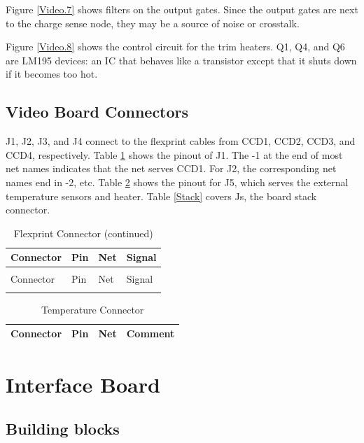 \documentclass[12pt]{article}
\let\oldsection\section
\renewcommand{\section}{\FloatBarrier\oldsection}
\let\oldsubsection\subsection
\renewcommand{\subsection}{\FloatBarrier\oldsubsection}
\begin{document}
Figure \ref{Video.7} shows filters on the output gates. Since the output gates are next to the charge sense node, they may be a source of noise or crosstalk.

Figure \ref{Video.8} shows the control circuit for the trim heaters. Q1, Q4, and Q6 are  LM195 devices: an IC that behaves like a transistor except that it shuts down if it becomes too hot.

\subsection{Video Board Connectors}

J1, J2, J3, and J4 connect to the flexprint cables from CCD1, CCD2, CCD3, and CCD4, respectively. Table \ref{J1} shows the pinout of J1. The -1 at the end of most net names indicates that the net serves CCD1. For J2, the corresponding net names end in -2, etc. Table \ref{J5} shows the pinout for J5, which serves the external temperature sensors and heater. Table \ref{Stack} covers Js, the board stack connector.

\begin{center}
\begin{longtable}{|l|l|l|l|}
\caption{Flexprint Connector} \label{J1} \\
\hline
Connector & Pin & Net & Signal \\
\hline \endfirsthead
\caption{Flexprint Connector (continued)} \\
\hline 
Connector & Pin & Net & Signal \\
\hline
\endhead
\hline \endfoot

\end{longtable}
\end{center}


\begin{table}[ht!]
\caption{Temperature Connector}
\begin{center}
\begin{tabular}{|l|l|l|l|}
\hline
Connector & Pin & Net & Comment \\
\hline

\hline
\end{tabular}
\end{center}
\label{J5}
\end{table}


\section{Interface Board}
\label{Interface}
\subsection{Building blocks}
\end{document}
